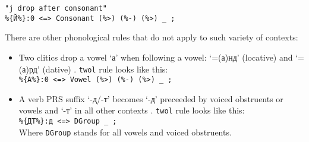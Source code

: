 \begin{code_frame}[float]
    \begin{footnotesize}
    \begin{verbatim}
"j drop after consonant"
%{Й%}:0 <=> Consonant (%>) (%-) (%>) _ ;
    \end{verbatim}
    \end{footnotesize}
    \tcblower
    \label{code:5_2}
\end{code_frame}


There are other phonological rules that do not apply to such variety of contexts:
\begin{itemize}
    \item Two clitics drop a vowel `а' when following a vowel: `=(а)нд' (locative) and `=(а)рд' (dative) . \texttt{twol} rule looks like this:\\
    \texttt{\%\{А\%\}:0 <=> Vowel (\%>) (\%-) (\%>) \_ ;}
    \item A verb PRS suffix `-д/-т' becomes `-д' preceeded by voiced obstruents or vowels and `-т' in all other contexts \parencite[262]{parker_shughni_2023}. \texttt{twol} rule looks like this:\\
    \texttt{\%\{ДТ\%\}:д <=> DGroup \_ ;}\\
    Where \texttt{DGroup} stands for all vowels and voiced obstruents.
\end{itemize}

